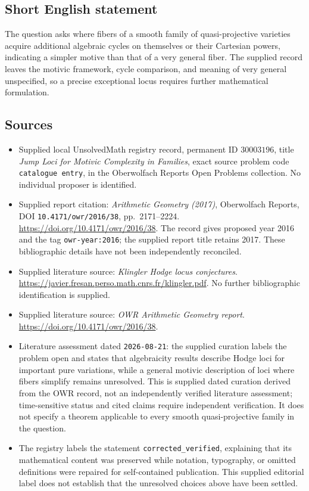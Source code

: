 \documentclass[11pt]{article}
\begin{document}
\subsection{Short English statement}
The question asks where fibers of a smooth family of quasi-projective varieties acquire additional algebraic cycles on themselves or their Cartesian powers, indicating a simpler motive than that of a very general fiber. The supplied record leaves the motivic framework, cycle comparison, and meaning of very general unspecified, so a precise exceptional locus requires further mathematical formulation.
\subsection{Sources}
\begin{itemize}
\item Supplied local UnsolvedMath registry record, permanent ID \(30003196\), title \emph{Jump Loci for Motivic Complexity in Families}, exact source problem code \texttt{catalogue entry}, in the Oberwolfach Reports Open Problems collection. No individual proposer is identified.
\item Supplied report citation: \emph{Arithmetic Geometry (2017)}, Oberwolfach Reports, DOI \texttt{10.4171/owr/2016/38}, pp.\ 2171--2224. \url{https://doi.org/10.4171/owr/2016/38}. The record gives proposed year 2016 and the tag \texttt{owr-year:2016}; the supplied report title retains 2017. These bibliographic details have not been independently reconciled.
\item Supplied literature source: \emph{Klingler Hodge locus conjectures}. \url{https://javier.fresan.perso.math.cnrs.fr/klingler.pdf}. No further bibliographic identification is supplied.
\item Supplied literature source: \emph{OWR Arithmetic Geometry report}. \url{https://doi.org/10.4171/owr/2016/38}.
\item Literature assessment dated \texttt{2026-08-21}: the supplied curation labels the problem open and states that algebraicity results describe Hodge loci for important pure variations, while a general motivic description of loci where fibers simplify remains unresolved. This is supplied dated curation derived from the OWR record, not an independently verified literature assessment; time-sensitive status and cited claims require independent verification. It does not specify a theorem applicable to every smooth quasi-projective family in the question.
\item The registry labels the statement \texttt{corrected\_verified}, explaining that its mathematical content was preserved while notation, typography, or omitted definitions were repaired for self-contained publication. This supplied editorial label does not establish that the unresolved choices above have been settled.
\end{itemize}
\end{document}

